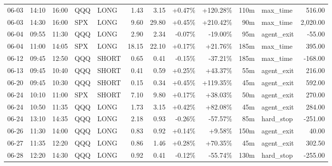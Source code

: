 \documentclass[11pt,a4paper,twoside]{article}
\begin{document}
\begin{center}
\begin{longtable}{>{\color{txtmain}}l l l l l r r r r r >{\color{txtmain}}l r}
06-03 & 14:10 & 16:00 & QQQ & LONG & 1.43 & 3.15 & \textcolor{wingreen}{+0.47\%} & \textcolor{wingreen}{+120.28\%} & 110m & max\_time & \textcolor{wingreen}{516.00} \\
06-03 & 14:30 & 16:00 & SPX & LONG & 9.60 & 29.80 & \textcolor{wingreen}{+0.45\%} & \textcolor{wingreen}{+210.42\%} & 90m & max\_time & \textcolor{wingreen}{2,020.00} \\
06-04 & 09:55 & 11:30 & QQQ & LONG & 2.90 & 2.34 & \textcolor{lossred}{-0.07\%} & \textcolor{lossred}{-19.00\%} & 95m & agent\_exit & \textcolor{lossred}{-55.00} \\
06-04 & 11:00 & 14:05 & SPX & LONG & 18.15 & 22.10 & \textcolor{wingreen}{+0.17\%} & \textcolor{wingreen}{+21.76\%} & 185m & max\_time & \textcolor{wingreen}{395.00} \\
06-12 & 09:45 & 12:50 & QQQ & SHORT & 0.65 & 0.41 & \textcolor{lossred}{-0.15\%} & \textcolor{lossred}{-37.21\%} & 185m & max\_time & \textcolor{lossred}{-168.00} \\
06-13 & 09:45 & 10:40 & QQQ & SHORT & 0.41 & 0.59 & \textcolor{wingreen}{+0.25\%} & \textcolor{wingreen}{+43.37\%} & 55m & agent\_exit & \textcolor{wingreen}{216.00} \\
06-20 & 09:45 & 10:30 & QQQ & SHORT & 0.15 & 0.34 & \textcolor{wingreen}{+0.45\%} & \textcolor{wingreen}{+119.35\%} & 45m & agent\_exit & \textcolor{wingreen}{592.00} \\
06-24 & 10:10 & 11:00 & SPX & SHORT & 7.10 & 9.80 & \textcolor{wingreen}{+0.17\%} & \textcolor{wingreen}{+38.03\%} & 50m & agent\_exit & \textcolor{wingreen}{270.00} \\
06-24 & 10:50 & 11:35 & QQQ & LONG & 1.73 & 3.15 & \textcolor{wingreen}{+0.42\%} & \textcolor{wingreen}{+82.08\%} & 45m & agent\_exit & \textcolor{wingreen}{284.00} \\
06-24 & 13:10 & 14:35 & QQQ & LONG & 2.18 & 0.93 & \textcolor{lossred}{-0.26\%} & \textcolor{lossred}{-57.57\%} & 85m & hard\_stop & \textcolor{lossred}{-251.00} \\
06-26 & 11:30 & 14:00 & QQQ & LONG & 0.83 & 0.92 & \textcolor{wingreen}{+0.14\%} & \textcolor{wingreen}{+9.58\%} & 150m & agent\_exit & \textcolor{wingreen}{40.00} \\
06-27 & 11:35 & 12:20 & QQQ & LONG & 0.86 & 1.46 & \textcolor{wingreen}{+0.28\%} & \textcolor{wingreen}{+70.35\%} & 45m & agent\_exit & \textcolor{wingreen}{302.50} \\
06-28 & 12:20 & 14:30 & QQQ & LONG & 0.92 & 0.41 & \textcolor{lossred}{-0.12\%} & \textcolor{lossred}{-55.74\%} & 130m & hard\_stop & \textcolor{lossred}{-255.00} \\

\end{longtable}
\end{center}
\end{document}
